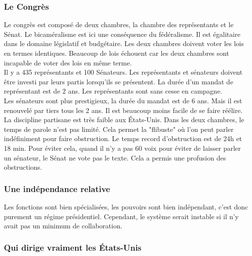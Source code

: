 \documentclass[10pt, a4paper, openany]{book}
\begin{document}
\subsubsection{Le Congrès}

Le congrès est composé de deux chambres, la chambre des représentants et le Sénat. Le bicaméralisme est ici une conséquence du fédéralisme. Il est égalitaire dans le domaine législatif et budgétaire. Les deux chambres doivent voter les lois en termes identiques. Beaucoup de lois échouent car les deux chambres sont incapable de voter des lois en même terme. \\
Il y a 435 représentants et 100 Sénateurs. Les représentants et sénateurs doivent être investi par leurs partis lorsqu'ils se présentent. La durée d'un mandat de représentant est de 2 ans. Les représentants sont sans cesse en campagne. \\
Les sénateurs sont plus prestigieux, la durée du mandat est de 6 ans. Mais il est renouvelé par tiers tous les 2 ans. Il est beaucoup moins facile de se faire réélire. \\
La discipline partisane est très faible aux États-Unis. Dans les deux chambres, le temps de parole n'est pas limité. Cela permet la "flibuste" où l'on peut parler indéfiniment pour faire obstruction. Le temps record d'obstruction est de 24h et 18 min. Pour éviter cela, quand il n'y a pas 60 voix pour éviter de laisser parler un sénateur, le Sénat ne vote pas le texte. Cela a permis une profusion des obstructions. 

\subsubsection{Une indépendance relative}

Les fonctions sont bien spécialisées, les pouvoirs sont bien indépendant, c'est donc purement un régime présidentiel. Cependant, le système serait instable si il n'y avait pas un minimum de collaboration. 























\subsubsection{Qui dirige vraiment les États-Unis}
\end{document}
